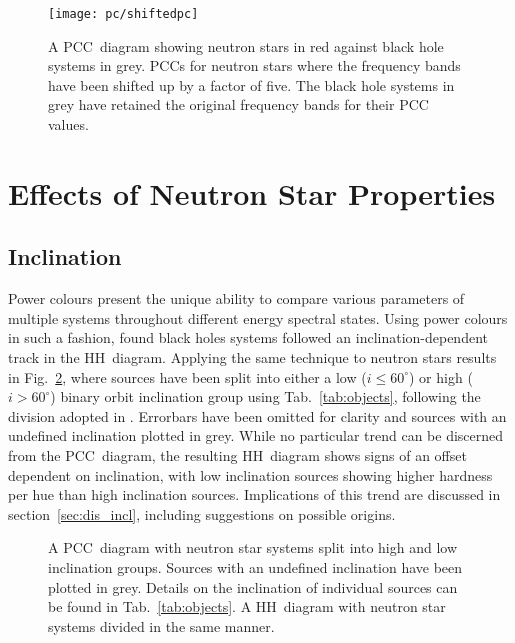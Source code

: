 \begin{figure}[p]
	\myfloatalign
	{\texttt{[image: pc/shiftedpc]}}
	\caption[Effect of shifting power colour frequency bands]{ A \ac{PCC}~diagram showing neutron stars in red against black hole systems in grey.  \acp{PCC} for neutron stars where the frequency bands have been shifted up by a factor of five. The black hole systems in grey have retained the original frequency bands for their \ac{PCC} values.}\label{fig:shiftedpc}
\end{figure}

\section{Effects of Neutron Star Properties}

\enlargethispage{2\baselineskip}
\subsection{Inclination}
Power colours present the unique ability to compare various parameters of multiple systems throughout different energy spectral states. Using power colours in such a fashion, \citet{heil2015inclination} found black holes systems followed an inclination-dependent track in the \ac{HH}~diagram. Applying the same technique to neutron stars results in Fig.~\ref{fig:inclination}, where sources have been split into either a low ($i\!\leq\!60^\circ$)  or high ($i\!>\!60^\circ$) binary orbit inclination group using Tab.~\ref{tab:objects}, following the division adopted in \citet{heil2015inclination}. Errorbars have been omitted for clarity and sources with an undefined inclination plotted in grey. While no particular trend can be discerned from the \ac{PCC}~diagram, the resulting \ac{HH}~diagram shows signs of an offset dependent on inclination, with low inclination sources showing higher hardness per hue than high inclination sources. Implications of this trend are discussed in section~\ref{sec:dis_incl}, including suggestions on possible origins.\\

\begin{figure}[p]
\myfloatalign%
%
\caption[Inclination effects]{ A \ac{PCC}~diagram with neutron star systems split into high and low inclination groups. Sources with an undefined inclination have been plotted in grey. Details on the inclination of individual sources can be found in Tab.~\ref{tab:objects}.  A \ac{HH}~diagram with neutron star systems divided in the same manner.}\label{fig:inclination}
\end{figure}


